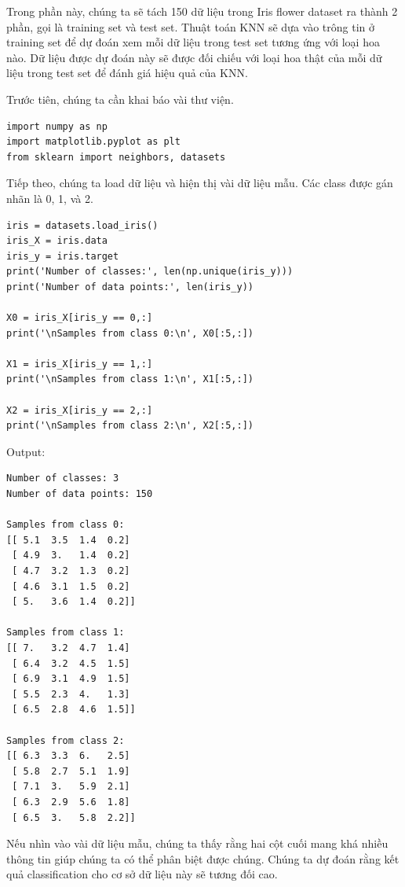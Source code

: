 \documentclass{article}
\begin{document}
Trong phần này, chúng ta sẽ tách 150 dữ liệu trong Iris flower dataset ra thành 2 phần, gọi là training set và test set. Thuật toán KNN sẽ dựa vào trông tin ở training set để dự đoán xem mỗi dữ liệu trong test set tương ứng với loại hoa nào. Dữ liệu được dự đoán này sẽ được đối chiếu với loại hoa thật của mỗi dữ liệu trong test set để đánh giá hiệu quả của KNN.

Trước tiên, chúng ta cần khai báo vài thư viện.

\begin{lstlisting}
import numpy as np
import matplotlib.pyplot as plt
from sklearn import neighbors, datasets
\end{lstlisting}

Tiếp theo, chúng ta load dữ liệu và hiện thị vài dữ liệu mẫu. Các class được gán nhãn là 0, 1, và 2.

\begin{lstlisting}
iris = datasets.load_iris()
iris_X = iris.data
iris_y = iris.target
print('Number of classes:', len(np.unique(iris_y)))
print('Number of data points:', len(iris_y))

X0 = iris_X[iris_y == 0,:]
print('\nSamples from class 0:\n', X0[:5,:])

X1 = iris_X[iris_y == 1,:]
print('\nSamples from class 1:\n', X1[:5,:])

X2 = iris_X[iris_y == 2,:]
print('\nSamples from class 2:\n', X2[:5,:])
\end{lstlisting}

Output:

\begin{lstlisting}
Number of classes: 3
Number of data points: 150

Samples from class 0:
[[ 5.1  3.5  1.4  0.2]
 [ 4.9  3.   1.4  0.2]
 [ 4.7  3.2  1.3  0.2]
 [ 4.6  3.1  1.5  0.2]
 [ 5.   3.6  1.4  0.2]]

Samples from class 1:
[[ 7.   3.2  4.7  1.4]
 [ 6.4  3.2  4.5  1.5]
 [ 6.9  3.1  4.9  1.5]
 [ 5.5  2.3  4.   1.3]
 [ 6.5  2.8  4.6  1.5]]

Samples from class 2:
[[ 6.3  3.3  6.   2.5]
 [ 5.8  2.7  5.1  1.9]
 [ 7.1  3.   5.9  2.1]
 [ 6.3  2.9  5.6  1.8]
 [ 6.5  3.   5.8  2.2]]
\end{lstlisting}

Nếu nhìn vào vài dữ liệu mẫu, chúng ta thấy rằng hai cột cuối mang khá nhiều thông tin giúp chúng ta có thể phân biệt được chúng. Chúng ta dự đoán rằng kết quả classification cho cơ sở dữ liệu này sẽ tương đối cao.
\\
\end{document}
